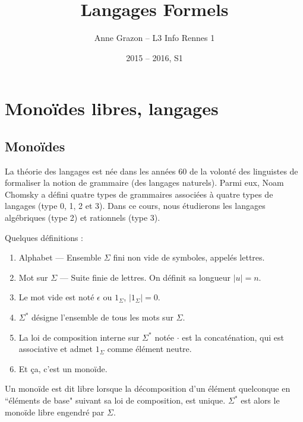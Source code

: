 \documentclass[a4paper]{article}
\title{Langages Formels}
\author{Anne Grazon -- L3 Info Rennes 1}
\date{2015 -- 2016, S1}
\begin{document}
\maketitle

\section{Monoïdes libres, langages}

\subsection{Monoïdes}

La théorie des langages est née dans les années 60 de la volonté des linguistes de formaliser la notion de grammaire (des langages naturels). Parmi eux, Noam Chomsky a défini quatre types de grammaires associées à quatre types de langages (type 0, 1, 2 et 3). Dans ce cours, nous étudierons les langages algébriques (type 2) et rationnels (type 3).

\begin{defi}Quelques définitions :
\begin{enumerate}
	\item Alphabet --- Ensemble $\Sigma$ fini non vide de symboles, appelés lettres.
	\item Mot sur $\Sigma$ --- Suite finie de lettres. On définit sa longueur $|u| = n$.
	\item Le mot vide est noté $\epsilon$ ou $1_\Sigma$, $|1_\Sigma| = 0$.
	\item $\Sigma^*$ désigne l'ensemble de tous les mots sur $\Sigma$.
	\item La loi de composition interne sur $\Sigma^*$ notée $\cdot$ est la concaténation, qui est associative et admet $1_\Sigma$ comme élément neutre.
	\item Et ça, c'est un monoïde.
\end{enumerate}
\end{defi}

\begin{defi}
Un monoïde est dit libre lorsque la décomposition d'un élément quelconque en ``éléments de base" suivant sa loi de composition, est unique. $\Sigma^*$ est alors le monoïde libre engendré par $\Sigma$.
\end{defi}
\end{document}
